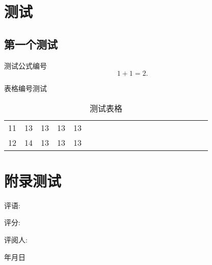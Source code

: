 \documentclass[forprint, AutoFakeBold, AutoFakeSlant ]{WHUBachelor}
\begin{document}


\cleardoublepage{}







\appendix

\chapter{测试}

\section{第一个测试}
测试公式编号
\begin{equation}
1+1=2.
\end{equation}

表格编号测试

\begin{table}[h]
  \centering
  \caption{测试表格}
  \begin{tabular}{*{20}c}
     \hline
     11 & 13  & 13  & 13  & 13 \\
     12 & 14  & 13  & 13  & 13 \\
     \hline
   \end{tabular}
\end{table}


\chapter{附录测试}

\begin{teacher}
\thispagestyle{empty}
评语: 
\par
\vspace*{12.5cm}
\hspace*{7.5cm}评分: 
\vspace*{1cm}

\hspace*{7.3cm}评阅人:

\vspace*{0.5cm}

\hspace*{10.1cm}年\hspace*{1cm}月\hspace*{1cm}日

\vspace*{0.5cm}

{\songti {} }

\end{teacher}


\cleardoublepage
\end{document}
